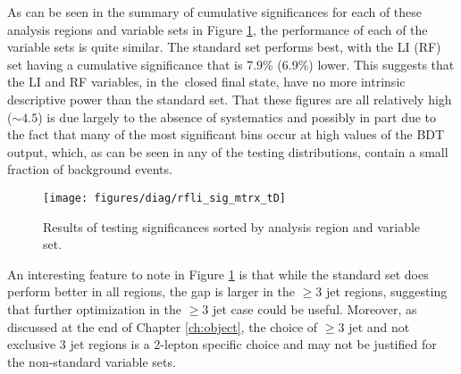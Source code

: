 As can be seen in the summary of cumulative significances for each of these analysis regions and variable sets in Figure \ref{fig:statonlysob}, the performance of each of the variable sets is quite similar.  The standard set performs best, with the LI (RF) set having a cumulative significance that is 7.9\% (6.9\%) lower.  This suggests that the LI and RF variables, in the \ZH\,closed final state, have no more intrinsic descriptive power than the standard set.  That these figures are all relatively high ($\sim4.5$) is due largely to the absence of systematics and possibly in part due to the fact that many of the most significant bins occur at high values of the BDT output, which, as can be seen in any of the testing distributions, contain a small fraction of background events.  
\begin{figure}[!htbp]\captionsetup{justification=centering}
  \centering
  \texttt{[image: figures/diag/rfli\_sig\_mtrx\_tD]}
  \caption{Results of testing significances sorted by analysis region and variable set.}
  \label{fig:statonlysob}
\end{figure}
An interesting feature to note in Figure \ref{fig:statonlysob} is that while the standard set does perform better in all regions, the gap is larger in the $\ge3$ jet regions, suggesting that further optimization in the $\ge3$ jet case could be useful.  Moreover, as discussed at the end of Chapter \ref{ch:object}, the choice of $\ge3$ jet and not exclusive 3 jet regions is a 2-lepton specific choice and may not be justified for the non-standard variable sets.
